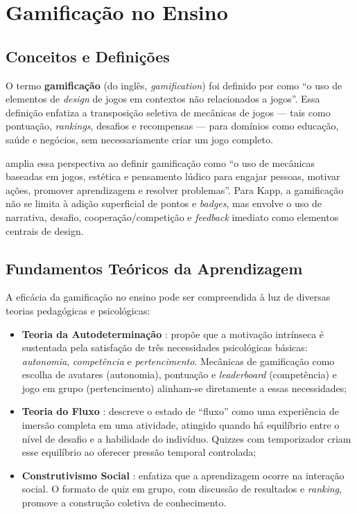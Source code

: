 \documentclass[
	12pt,
	openany,
	oneside,
	a4paper,
	english,
	brazil
]{abntex2}
\begin{document}
\section{Gamificação no Ensino}\label{sec:gamificacao}

\subsection{Conceitos e Definições}

O termo \textbf{gamificação} (do inglês, \textit{gamification}) foi definido por  como ``o uso de elementos de \textit{design} de jogos em contextos não relacionados a jogos''. Essa definição enfatiza a transposição seletiva de mecânicas de jogos --- tais como pontuação, \textit{rankings}, desafios e recompensas --- para domínios como educação, saúde e negócios, sem necessariamente criar um jogo completo.

 amplia essa perspectiva ao definir gamificação como ``o uso de mecânicas baseadas em jogos, estética e pensamento lúdico para engajar pessoas, motivar ações, promover aprendizagem e resolver problemas''. Para Kapp, a gamificação não se limita à adição superficial de pontos e \textit{badges}, mas envolve o uso de narrativa, desafio, cooperação/competição e \textit{feedback} imediato como elementos centrais de design.

\subsection{Fundamentos Teóricos da Aprendizagem}

A eficácia da gamificação no ensino pode ser compreendida à luz de diversas teorias pedagógicas e psicológicas:

\begin{itemize}
  \item \textbf{Teoria da Autodeterminação} \cite{ryan2000}: propõe que a motivação intrínseca é sustentada pela satisfação de três necessidades psicológicas básicas: \textit{autonomia}, \textit{competência} e \textit{pertencimento}. Mecânicas de gamificação como escolha de avatares (autonomia), pontuação e \textit{leaderboard} (competência) e jogo em grupo (pertencimento) alinham-se diretamente a essas necessidades;

  \item \textbf{Teoria do Fluxo} \cite{csikszentmihalyi1990}: descreve o estado de ``fluxo'' como uma experiência de imersão completa em uma atividade, atingido quando há equilíbrio entre o nível de desafio e a habilidade do indivíduo. Quizzes com temporizador criam esse equilíbrio ao oferecer pressão temporal controlada;

  \item \textbf{Construtivismo Social} \cite{vygotsky1978}: enfatiza que a aprendizagem ocorre na interação social. O formato de quiz em grupo, com discussão de resultados e \textit{ranking}, promove a construção coletiva de conhecimento.
\end{itemize}
\end{document}

